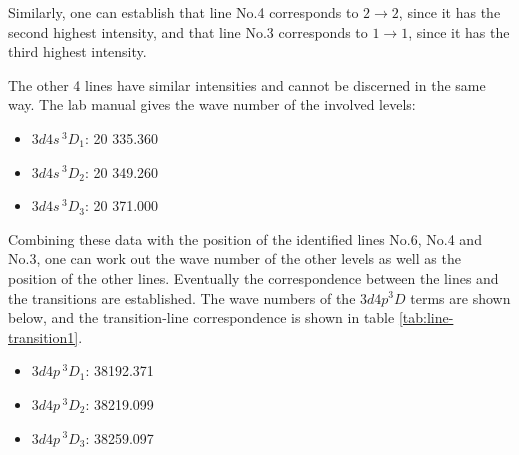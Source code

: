 \documentclass[a4paper]{article}
\begin{document}
Similarly, one can establish that line No.4 corresponds to $2 \to 2$,
since it has the second highest intensity, and that line No.3
corresponds to $1 \to 1$, since it has the third highest intensity.

The other 4 lines have similar intensities and cannot be discerned in
the same way. The lab manual gives the wave number of the involved
levels:
\begin{itemize}
\item $3d4s\,^3D_1$: 20 335.360
\item $3d4s\,^3D_2$: 20 349.260
\item $3d4s\,^3D_3$: 20 371.000
\end{itemize}
Combining these data with the position of the identified lines No.6,
No.4 and No.3, one can work out the wave number of the other levels as
well as the position of the other lines. Eventually the correspondence
between the lines and the transitions are established. The wave
numbers of the $3d4p ^3D$ terms are shown below, and the
transition-line correspondence is shown in table
\ref{tab:line-transition1}.
\begin{itemize}
\item $3d4p\,^3D_1$: 38192.371
\item $3d4p\,^3D_2$: 38219.099
\item $3d4p\,^3D_3$: 38259.097
\end{itemize}
\end{document}

